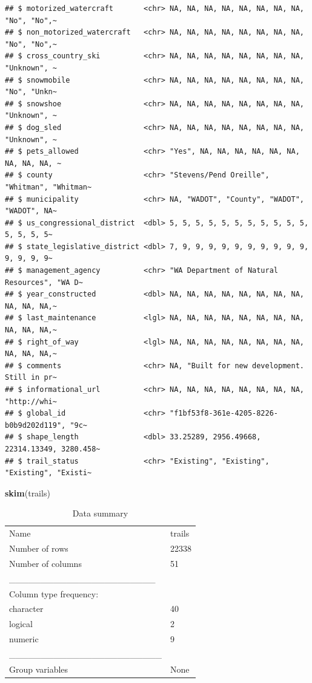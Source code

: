 \documentclass[
]{article}
\newenvironment{Shaded}{\begin{snugshade}}{\end{snugshade}}
\newcommand{\FunctionTok}[1]{\textcolor[rgb]{0.13,0.29,0.53}{\textbf{#1}}}
\newcommand{\NormalTok}[1]{#1}
\begin{document}
\begin{verbatim}
## $ motorized_watercraft       <chr> NA, NA, NA, NA, NA, NA, NA, NA, "No", "No",~
## $ non_motorized_watercraft   <chr> NA, NA, NA, NA, NA, NA, NA, NA, "No", "No",~
## $ cross_country_ski          <chr> NA, NA, NA, NA, NA, NA, NA, NA, "Unknown", ~
## $ snowmobile                 <chr> NA, NA, NA, NA, NA, NA, NA, NA, "No", "Unkn~
## $ snowshoe                   <chr> NA, NA, NA, NA, NA, NA, NA, NA, "Unknown", ~
## $ dog_sled                   <chr> NA, NA, NA, NA, NA, NA, NA, NA, "Unknown", ~
## $ pets_allowed               <chr> "Yes", NA, NA, NA, NA, NA, NA, NA, NA, NA, ~
## $ county                     <chr> "Stevens/Pend Oreille", "Whitman", "Whitman~
## $ municipality               <chr> NA, "WADOT", "County", "WADOT", "WADOT", NA~
## $ us_congressional_district  <dbl> 5, 5, 5, 5, 5, 5, 5, 5, 5, 5, 5, 5, 5, 5, 5~
## $ state_legislative_district <dbl> 7, 9, 9, 9, 9, 9, 9, 9, 9, 9, 9, 9, 9, 9, 9~
## $ management_agency          <chr> "WA Department of Natural Resources", "WA D~
## $ year_constructed           <dbl> NA, NA, NA, NA, NA, NA, NA, NA, NA, NA, NA,~
## $ last_maintenance           <lgl> NA, NA, NA, NA, NA, NA, NA, NA, NA, NA, NA,~
## $ right_of_way               <lgl> NA, NA, NA, NA, NA, NA, NA, NA, NA, NA, NA,~
## $ comments                   <chr> NA, "Built for new development. Still in pr~
## $ informational_url          <chr> NA, NA, NA, NA, NA, NA, NA, NA, "http://whi~
## $ global_id                  <chr> "f1bf53f8-361e-4205-8226-b0b9d202d119", "9c~
## $ shape_length               <dbl> 33.25289, 2956.49668, 22314.13349, 3280.458~
## $ trail_status               <chr> "Existing", "Existing", "Existing", "Existi~
\end{verbatim}

\begin{Shaded}
\begin{Highlighting}[]
\FunctionTok{skim}\NormalTok{(trails)}
\end{Highlighting}
\end{Shaded}

\begin{longtable}[]{@{}ll@{}}
\caption{Data summary}\tabularnewline
\toprule\noalign{}
\endfirsthead
\endhead
\bottomrule\noalign{}
\endlastfoot
Name & trails \\
Number of rows & 22338 \\
Number of columns & 51 \\
\_\_\_\_\_\_\_\_\_\_\_\_\_\_\_\_\_\_\_\_\_\_\_ & \\
Column type frequency: & \\
character & 40 \\
logical & 2 \\
numeric & 9 \\
\_\_\_\_\_\_\_\_\_\_\_\_\_\_\_\_\_\_\_\_\_\_\_\_ & \\
Group variables & None \\
\end{longtable}
\end{document}
